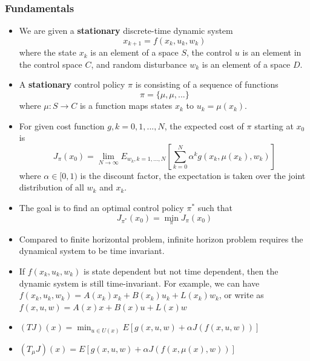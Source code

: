 \begin{refsection}
\subsubsection{Fundamentals}
\begin{definition}\cite[3]{bertsekas2012dynamic2}\hfill
	\begin{itemize}
		\item We are given a \textbf{stationary} discrete-time dynamic system
		$$x_{k+1}  =  f(x_k,u_k,w_k)$$
		where the state $x_k$ is an element of a space $S$, the control $u$ is an element in the control space $C$, and random disturbance $w_k$ is an element of a space $D$.
		\item A \textbf{stationary} control policy $\pi$ is consisting of a sequence of functions
		$$\pi = \{\mu,\mu,...\}$$
		where $\mu:S\to C$ is a function  maps states $x_k$ to $u_k = \mu(x_k)$.
		\item For given cost function $g,k=0,1,...,N$, the expected cost of $\pi$ starting at $x_0$ is
		$$J_\pi(x_0) = \lim_{N\to\infty}E_{w_k,k=1,...,N}[\sum_{k=0}^N \alpha^k g(x_k,\mu(x_k),w_k)]$$
		where $\alpha\in [0,1)$ is the discount factor, the expectation is taken over the joint distribution of all $w_k$ and $x_k$.
		\item The goal is to find an optimal control policy $\pi^*$ such that 
		$$J_{\pi^*}(x_0) = \min_{\pi} J_\pi(x_0)$$
	\end{itemize}
\end{definition}

\begin{remark}\hfill
	\begin{itemize}
		\item Compared to finite horizontal problem, infinite horizon problem requires the dynamical system to be time invariant. 
		\item If $f(x_k,u_k,w_k)$ is state dependent but not time dependent, then the dynamic system is still time-invariant. For example, we can have $f(x_k,u_k,w_k) = A(x_k)x_k + B(x_k)u_k + L(x_k)w_k$, or write as $f(x,u,w) = A(x)x + B(x)u + L(x)w$
	\end{itemize}	
\end{remark}


\begin{definition}\hfill
	\begin{itemize}
		\item $(TJ)(x) = \min_{u\in U(x)} E[g(x,u,w) + \alpha J(f(x,u,w))]$
		\item $(T_\mu J)(x) =  E[g(x,u,w) + \alpha J(f(x,\mu(x),w))]$
	\end{itemize}
\end{definition}



\end{refsection}
